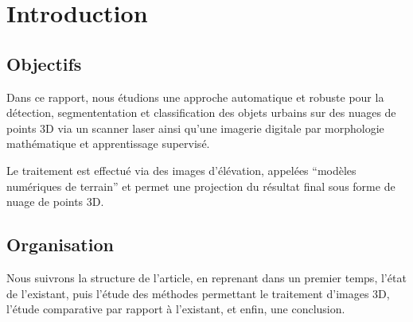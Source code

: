 \chapter{Introduction}
\section{Objectifs}

Dans ce rapport, nous étudions une approche automatique et robuste pour la détection, segmententation et classification des objets urbains sur des nuages de points 3D via un scanner laser ainsi qu'une imagerie digitale par morphologie mathématique et apprentissage supervisé. 

Le traitement est effectué via des images d'élévation, appelées \enquote{modèles numériques de terrain} et permet une projection du résultat final sous forme de nuage de points 3D. 

\section{Organisation}

Nous suivrons la structure de l'article, en reprenant dans un premier temps, l'état de l'existant, puis l'étude des méthodes permettant le traitement d'images 3D, l'étude comparative par rapport à l'existant, et enfin, une conclusion.